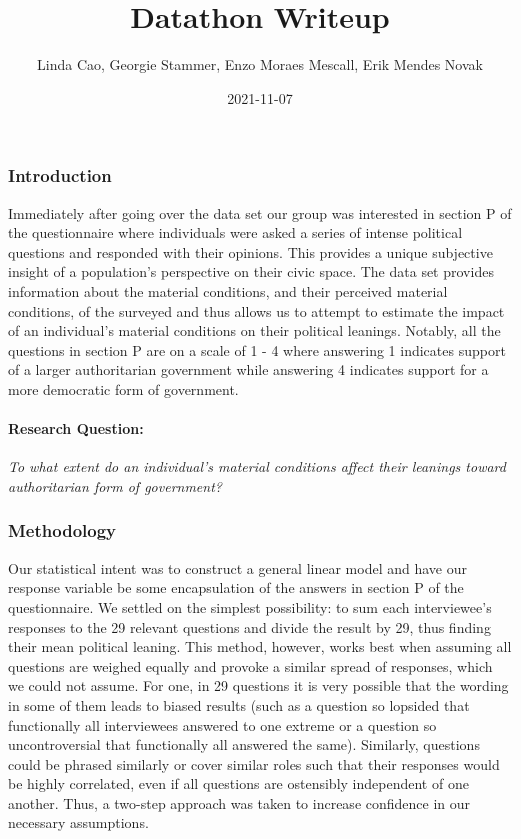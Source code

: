 \documentclass[
]{article}
\title{Datathon Writeup}
\author{Linda Cao, Georgie Stammer, Enzo Moraes Mescall, Erik Mendes
Novak}
\date{2021-11-07}
\begin{document}
\maketitle

\hypertarget{introduction}{%
\subsubsection{Introduction}\label{introduction}}

Immediately after going over the data set our group was interested in
section P of the questionnaire where individuals were asked a series of
intense political questions and responded with their opinions. This
provides a unique subjective insight of a population's perspective on
their civic space. The data set provides information about the material
conditions, and their perceived material conditions, of the surveyed and
thus allows us to attempt to estimate the impact of an individual's
material conditions on their political leanings. Notably, all the
questions in section P are on a scale of 1 - 4 where answering 1
indicates support of a larger authoritarian government while answering 4
indicates support for a more democratic form of government.

\hypertarget{research-question}{%
\paragraph{Research Question:}\label{research-question}}

\emph{To what extent do an individual's material conditions affect their
leanings toward authoritarian form of government?}

\hypertarget{methodology}{%
\subsubsection{Methodology}\label{methodology}}

Our statistical intent was to construct a general linear model and have
our response variable be some encapsulation of the answers in section P
of the questionnaire. We settled on the simplest possibility: to sum
each interviewee's responses to the 29 relevant questions and divide the
result by 29, thus finding their mean political leaning. This method,
however, works best when assuming all questions are weighed equally and
provoke a similar spread of responses, which we could not assume. For
one, in 29 questions it is very possible that the wording in some of
them leads to biased results (such as a question so lopsided that
functionally all interviewees answered to one extreme or a question so
uncontroversial that functionally all answered the same). Similarly,
questions could be phrased similarly or cover similar roles such that
their responses would be highly correlated, even if all questions are
ostensibly independent of one another. Thus, a two-step approach was
taken to increase confidence in our necessary assumptions.
\end{document}
